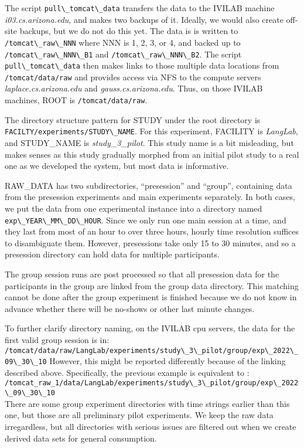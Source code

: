 \documentclass[11pt,letterpaper,oneside,openany,article]{memoir}
\newcommand{\code}[1]{\lstinline{#1}}
\begin{document}
The script \code{pull\_tomcat\_data} transfers the data to the IVILAB machine
\textit{i03.cs.arizona.edu}, and makes two backups of it.  Ideally, we would
also create off-site backups, but we do not do this yet. The data is is
written to
\code{/tomcat\_raw\_NNN} where NNN is 1, 2, 3, or 4, and backed up to
\code{/tomcat\_raw\_NNN\_B1} and \code{/tomcat\_raw\_NNN\_B2}.
The script \code{pull\_tomcat\_data} then makes links to those multiple data
locations from \code{/tomcat/data/raw} and provides access via NFS to the compute
servers \textit{laplace.cs.arizona.edu} and \textit{gauss.cs.arizona.edu}.
Thus, on those IVILAB machines, ROOT is \code{/tomcat/data/raw}.

The directory structure pattern for STUDY under the root directory is
\code{FACILTY/experiments/STUDY\_NAME}. For this experiment, FACILITY is
\textit{LangLab}, and STUDY\_NAME is \textit{study\_3\_pilot}.
This study name is a bit misleading, but makes senses as this study
gradually morphed from an initial pilot study to a real one as we developed the
system, but most data is informative.

RAW\_DATA has two subdirectories, ``presession'' and ``group'', containing data
from the presession experiments and main experiments separately. In both cases, we put the
data from one experimental instance into a directory named
\code{exp\_YEAR\_MM\_DD\_HOUR}. Since we only run one main session at a time, and
they last from most of an hour to over three hours, hourly time resolution
suffices to disambiguate them. However, presessions take only 15 to 30 minutes,
and so a presession directory can hold data for multiple participants.

The group session runs are post processed so that all presession data for the
participants in the group are linked from the group data directory. This
matching cannot be done after the group experiment is finished because we do not
know in advance whether there will be no-shows or other last minute changes.

To further clarify directory naming, on the IVILAB cpu servers,
the data for the first valid group session
is in:\\
\code{/tomcat/data/raw/LangLab/experiments/study\_3\_pilot/group/exp\_2022\_09\_30\_10}
However, this might be reported  differently because of the linking described
above. Specifically, the previous example is equivalent to :\\
\code{/tomcat_raw_1/data/LangLab/experiments/study\_3\_pilot/group/exp\_2022\_09\_30\_10}\\
There are some group experiment directories with time strings earlier than this
one, but those are all preliminary pilot experiments. We keep the raw data
irregardless, but all directories with serious issues are filtered out when we
create derived data sets for general consumption.
\end{document}
